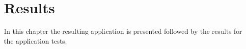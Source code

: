 \chapter{Results} \label{results}
In this chapter the resulting application is presented followed by the results for the application tests.




